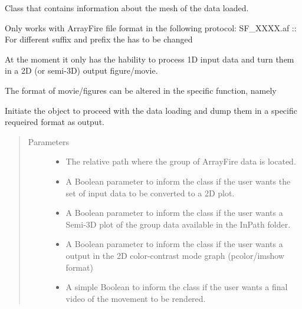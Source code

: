 \documentclass[letterpaper,10pt,english]{sphinxmanual}
\begin{document}
\begin{fulllineitems}
\label{\detokenize{index:Loader.meshPlot}}
Class that contains information about the mesh of the data loaded.

Only works with ArrayFire file format in the following protocol: SF\_XXXX.af
:: For different suffix and prefix the  has to be changed

At the moment it only has the hability to process 1D input data and turn them in a 2D (or semi-3D) output figure/movie.

The format of movie/figures can be altered in the specific function, namely 

Initiate the object to proceed with the data loading and dump them in a specific requeired format as output.
\begin{quote}\begin{description}
\item[{Parameters}] \leavevmode\begin{itemize}
\item {} 
 \textendash{} The relative path where the group of ArrayFire data is located.

\item {} 
 \textendash{} A Boolean parameter to inform the class if the user wants the set of input data to be converted to a 2D plot.

\item {} 
 \textendash{} A Boolean parameter to inform the class if the user wants a Semi-3D plot of the group data available in the InPath folder.

\item {} 
 \textendash{} A Boolean parameter to inform the class if the user wants a output in the 2D color-contrast mode graph (pcolor/imshow format)

\item {} 
 \textendash{} A simple Boolean to inform the class if the user wants a final video of the movement to be rendered.

\end{itemize}


\end{description}
\end{quote}
\end{fulllineitems}
\end{document}
